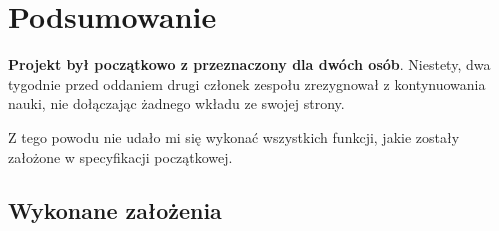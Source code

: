 \chapter{Podsumowanie}
\label{summary}

\textbf{Projekt był początkowo z przeznaczony dla dwóch osób}. Niestety, dwa tygodnie przed oddaniem drugi członek zespołu zrezygnował z kontynuowania nauki, nie dołączając żadnego wkładu ze swojej strony.

Z tego powodu nie udało mi się wykonać wszystkich funkcji, jakie zostały założone w specyfikacji początkowej.

\section{Wykonane założenia}

